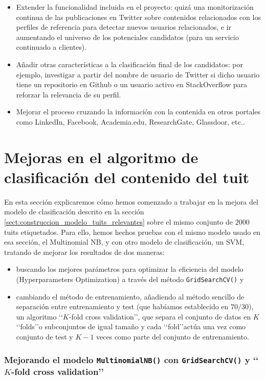 \begin{itemize}
\item Extender la funcionalidad incluida en el proyecto: quizá una monitorización
continua de las publicaciones en Twitter sobre contenidos relacionados con los perfiles de 
referencia para detectar nuevos usuarios relacionados, e ir aumentando el universo de los 
potenciales candidatos (para un servicio continuado a clientes).
\item Añadir otras características a la clasificación final de los candidatos: por ejemplo,
investigar a partir del nombre de usuario de Twitter si dicho usuario tiene un repositorio en 
Github o un usuario activo en StackOverflow para reforzar la relevancia de su perfil.
\item Mejorar el proceso cruzando la información con la contenida en otros portales como 
LinkedIn,  Facebook, Academia.edu, ResearchGate, Glassdoor, etc..
\end{itemize} 

\section{Mejoras en el algoritmo de clasificación del contenido del tuit}
\label{sect:mejoras_alg_clasificacion_tuit}
En esta sección explicaremos cómo hemos comenzado a trabajar en la mejora del modelo de 
clasificación descrito en la sección \ref{sect:construccion_modelo_tuits_relevantes} sobre
el mismo conjunto de $2000$ tuits etiquetados.
Para ello, hemos hechos pruebas con el mismo modelo usado en esa sección, el Multinomial NB, y con otro modelo de clasificación, un SVM, tratando de mejorar los resultados de dos maneras:
\begin{itemize}
\item buscando los mejores parámetros para optimizar la eficiencia del modelo 
(Hyperparameters Optimization) a través del método {\tt GridSearchCV()} y 
\item cambiando el método de entrenamiento, añadiendo al
método sencillo de separación entre entrenamiento y test (que habíamos establecido en $70/30$), 
un algoritmo \lq\lq $K$-fold cross va\-li\-da\-tion\rq\rq, que separa el conjunto de datos en $K$ 
\lq\lq folds\rq\rq o subconjuntos de igual tamaño y cada \lq\lq fold\rq\rq actúa una vez como 
conjunto de test y $K-1$ veces como parte del conjunto de entrenamiento.
\end{itemize}

\subsubsection{Mejorando el modelo {\tt MultinomialNB()} con {\tt GridSearchCV()}
y \lq\lq $K$-fold cross validation\rq\rq}

